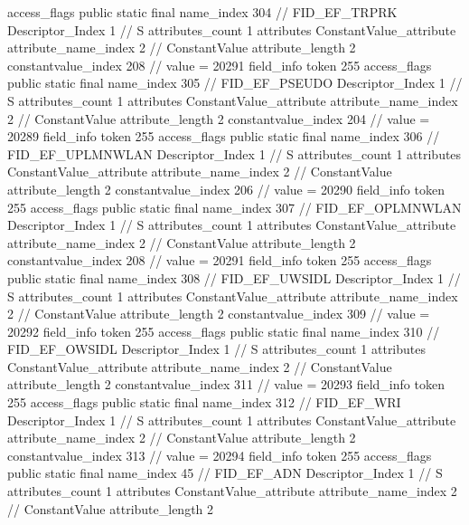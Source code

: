 {{{{{				access_flags	public static final
				name_index	304		// FID_EF_TRPRK
				Descriptor_Index	1		// S
				attributes_count	1
				attributes {
				ConstantValue_attribute {
					attribute_name_index	2		// ConstantValue
					attribute_length	2
					constantvalue_index	208		// value = 20291
				}
				}
			}
			field_info {
				token	255
				access_flags	public static final
				name_index	305		// FID_EF_PSEUDO
				Descriptor_Index	1		// S
				attributes_count	1
				attributes {
				ConstantValue_attribute {
					attribute_name_index	2		// ConstantValue
					attribute_length	2
					constantvalue_index	204		// value = 20289
				}
				}
			}
			field_info {
				token	255
				access_flags	public static final
				name_index	306		// FID_EF_UPLMNWLAN
				Descriptor_Index	1		// S
				attributes_count	1
				attributes {
				ConstantValue_attribute {
					attribute_name_index	2		// ConstantValue
					attribute_length	2
					constantvalue_index	206		// value = 20290
				}
				}
			}
			field_info {
				token	255
				access_flags	public static final
				name_index	307		// FID_EF_OPLMNWLAN
				Descriptor_Index	1		// S
				attributes_count	1
				attributes {
				ConstantValue_attribute {
					attribute_name_index	2		// ConstantValue
					attribute_length	2
					constantvalue_index	208		// value = 20291
				}
				}
			}
			field_info {
				token	255
				access_flags	public static final
				name_index	308		// FID_EF_UWSIDL
				Descriptor_Index	1		// S
				attributes_count	1
				attributes {
				ConstantValue_attribute {
					attribute_name_index	2		// ConstantValue
					attribute_length	2
					constantvalue_index	309		// value = 20292
				}
				}
			}
			field_info {
				token	255
				access_flags	public static final
				name_index	310		// FID_EF_OWSIDL
				Descriptor_Index	1		// S
				attributes_count	1
				attributes {
				ConstantValue_attribute {
					attribute_name_index	2		// ConstantValue
					attribute_length	2
					constantvalue_index	311		// value = 20293
				}
				}
			}
			field_info {
				token	255
				access_flags	public static final
				name_index	312		// FID_EF_WRI
				Descriptor_Index	1		// S
				attributes_count	1
				attributes {
				ConstantValue_attribute {
					attribute_name_index	2		// ConstantValue
					attribute_length	2
					constantvalue_index	313		// value = 20294
				}
				}
			}
			field_info {
				token	255
				access_flags	public static final
				name_index	45		// FID_EF_ADN
				Descriptor_Index	1		// S
				attributes_count	1
				attributes {
				ConstantValue_attribute {
					attribute_name_index	2		// ConstantValue
					attribute_length	2
}}}}}}}
